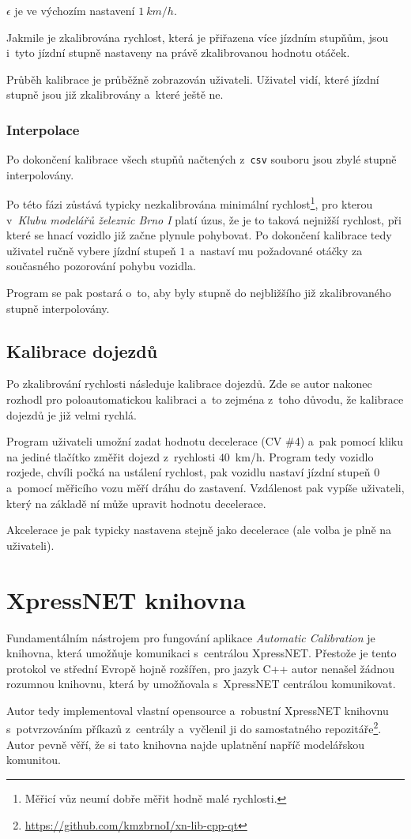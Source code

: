 $\epsilon$ je ve výchozím nastavení $1\ km/h$.

Jakmile je zkalibrována rychlost, která je přiřazena více jízdním stupňům,
jsou i~tyto jízdní stupně nastaveny na právě zkalibrovanou hodnotu otáček.

Průběh kalibrace je průběžně zobrazován uživateli. Uživatel vidí, které
jízdní stupně jsou již zkalibrovány a~které ještě ne.

\subsubsection{Interpolace}

Po dokončení kalibrace všech stupňů načtených z~\texttt{csv} souboru jsou zbylé
stupně interpolovány.

Po této fázi zůstává typicky nezkalibrována minimální
rychlost\footnote{Měřicí vůz neumí dobře měřit hodně malé rychlosti.}, pro kterou
v~\textit{Klubu modelářů železnic Brno I} platí úzus, že je to taková nejnižší
rychlost, při které se hnací vozidlo již začne plynule pohybovat. Po dokončení
kalibrace tedy uživatel ručně vybere jízdní stupeň $1$ a~nastaví mu
požadované otáčky za současného pozorování pohybu vozidla.

Program se pak postará o~to, aby byly stupně do nejbližšího již zkalibrovaného
stupně interpolovány.

\subsection{Kalibrace dojezdů}

Po zkalibrování rychlosti následuje kalibrace dojezdů. Zde se autor nakonec
rozhodl pro poloautomatickou kalibraci a~to zejména z~toho důvodu, že kalibrace
dojezdů je již velmi rychlá.

Program uživateli umožní zadat hodnotu decelerace (\gls{CV} \#4) a~pak pomocí kliku
na jediné tlačítko změřit dojezd z~rychlosti $40$~km/h. Program tedy vozidlo
rozjede, chvíli počká na ustálení rychlost, pak vozidlu nastaví jízdní stupeň
$0$ a~pomocí měřicího vozu měří dráhu do zastavení. Vzdálenost pak vypíše
uživateli, který na základě ní může upravit hodnotu decelerace.

Akcelerace je pak typicky nastavena stejně jako decelerace (ale volba je plně
na uživateli).

\section{XpressNET knihovna}
\label{sec:xn-lib}

Fundamentálním nástrojem pro fungování aplikace \textit{Automatic Calibration}
je knihovna, která umožňuje komunikaci s~centrálou XpressNET. Přestože je tento
protokol ve střední Evropě hojně rozšířen, pro jazyk C++ autor nenašel žádnou
rozumnou knihovnu, která by umožňovala s~XpressNET centrálou komunikovat.

Autor tedy implementoval vlastní opensource a~robustní XpressNET knihovnu
s~potvrzováním příkazů z~centrály a~vyčlenil ji do samostatného
repozitáře\footnote{\url{https://github.com/kmzbrnoI/xn-lib-cpp-qt}}. Autor
pevně věří, že si tato knihovna najde uplatnění napříč modelářskou komunitou.
